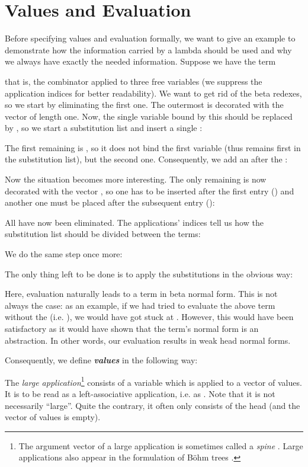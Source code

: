 \documentclass[submission,copyright,creativecommons]{eptcs}
\newcommand{\define}[1]{\mbox{\textbf{\textit{#1}}}}
\begin{document}
\section{Values and Evaluation} 
\label{sec:values}

Before specifying values and evaluation formally, we want to give an example to demonstrate how the information carried by a lambda should be used and why we always have exactly the needed information. Suppose we have the term

that is, the  combinator applied to three free variables
(we suppress the application indices  for better readability). We want to get rid of the beta redexes, so we start by eliminating the first one. The outermost  is decorated with the vector  of length one. Now, the single variable bound by this  should be replaced by , so we start a substitution list and insert a single :

The first remaining  is , so it does not bind the first variable (thus  remains first in the substitution list), but the second one. Consequently, we add an  after the :

Now the situation becomes more interesting. The only remaining  is now decorated with the vector , so one  has to be inserted after the first entry () and another one must be placed after the subsequent entry ():

All  have now been eliminated. The applications' indices tell us how the substitution list should be divided between the terms:

We do the same step once more:

The only thing left to be done is to apply the substitutions in the obvious way:

Here, evaluation naturally leads to a term in beta normal form. This is not always the case: as an example, if we had tried to evaluate the above term without the  (i.e. ), we would have got stuck at . However, this would have been satisfactory as it would have shown that the term's normal form is an abstraction. In other words, our evaluation results in weak head normal forms.

Consequently, we define \define{values} in the following way:

The \emph{large application}\footnote{
The argument vector  of a large application is sometimes
called a \emph{spine} \cite{cervesatoPfenning:spineCalculus}.  Large
applications  also appear in the formulation of B\"ohm
trees \cite{barendregt:lambdacalculus}.}
 consists of a variable  which is applied to a vector  of values. It is to be read as a left-associative application, i.e. as . 
Note that it is not necessarily ``large''. Quite the contrary, it
often only consists of the head (and the vector of values is empty).
\end{document}
